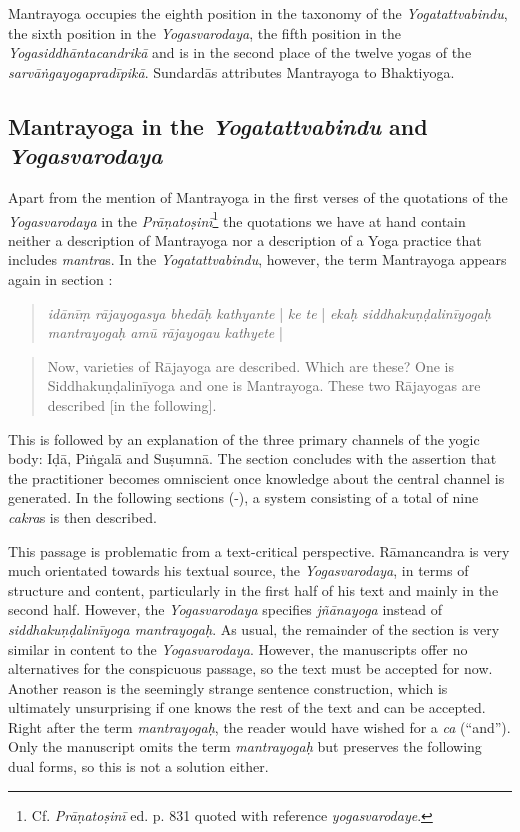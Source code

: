 Mantrayoga occupies the eighth position in the taxonomy of the \textit{Yogatattvabindu}, the sixth position in the \textit{Yogasvarodaya}, the fifth position in the \textit{Yogasiddhāntacandrikā} and is in the second place of the twelve yogas of the \textit{sarvāṅgayogapradīpikā}. Sundardās attributes Mantrayoga to Bhaktiyoga.

\subsection{Mantrayoga in the \textit{Yogatattvabindu} and \textit{Yogasvarodaya}}

Apart from the mention of Mantrayoga in the first verses of the quotations of the \textit{Yogasvarodaya} in the \textit{Prāṇatoṣinī}\footnote{Cf. \emph{Prāṇatoṣinī} ed. p. 831 quoted with reference \textit{yogasvarodaye}.} the quotations we have at hand contain neither a description of Mantrayoga nor a description of a Yoga practice that includes \textit{mantra}s. In the \textit{Yogatattvabindu}, however, the term Mantrayoga appears again in section :

\begin{quote}
  \textit{idānīṃ rājayogasya bhedāḥ kathyante} | \textit{ke te} | \textit{ekaḥ siddhakuṇḍalinīyogaḥ mantrayogaḥ amū rājayogau kathyete} |
\end{quote}
\begin{quote}
  Now, varieties of Rājayoga are described. Which are these? One is Siddhakuṇḍalinīyoga and one is Mantrayoga. These two Rājayogas are described [in the following].
\end{quote}

This is followed by an explanation of the three primary channels of the yogic body: Iḍā, Piṅgalā and Suṣumnā. The section concludes with the assertion that the practitioner becomes omniscient once knowledge about the central channel is generated. In the following sections (-), a system consisting of a total of nine \textit{cakra}s is then described.

This passage is problematic from a text-critical perspective. Rāmancandra is very much orientated towards his textual source, the \textit{Yogasvarodaya}, in terms of structure and content, particularly in the first half of his text and mainly in the second half. However, the \textit{Yogasvarodaya} specifies \textit{jñānayoga} instead of \textit{siddhakuṇḍalinīyoga mantrayogaḥ}. As usual, the remainder of the section is very similar in content to the \textit{Yogasvarodaya}. However, the manuscripts offer no alternatives for the conspicuous passage, so the text must be accepted for now. Another reason is the seemingly strange sentence construction, which is ultimately unsurprising if one knows the rest of the text and can be accepted. Right after the term \textit{mantrayogaḥ}, the reader would have wished for a \textit{ca} (``and''). Only the manuscript  omits the term \textit{mantrayogaḥ} but preserves the following dual forms, so this is not a solution either.    

